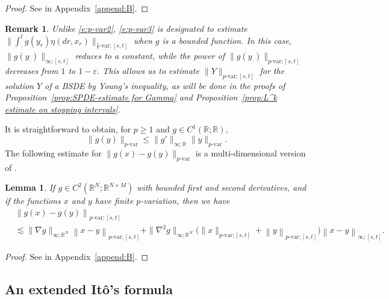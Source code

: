 \documentclass[11pt,reqno]{amsart}
\def\R{\mathbb R}
\newtheorem{lemma}{Lemma}[section]
\newtheorem{remark}{Remark}[section]
\numberwithin{equation}{section}
\begin{document}
\begin{proof}
See  in Appendix~\ref{append:B}.
\end{proof}

\begin{remark}\label{rem:interpolation}
Unlike \eqref{e:p-var2}, \eqref{e:p-var3} is designated to estimate $ \|\int_{\cdot}^{t} g(y_{r})\eta(dr,x_{r}) \|_{\frac{1}{\tau}\text{-}\mathrm{var};[s,t]}$ when $g$ is a \emph{bounded} function. In this case, $\|g(y_\cdot)\|_{\infty;[s,t]}$ reduces to a constant, while the power of $\|g(y_\cdot)\|_{p\text{-}\mathrm{var};[s,t]}$ decreases from $1$ to $1-\varepsilon$. This allows us to estimate $\|Y\|_{p\text{-}\mathrm{var};[s,t]}$ for the solution
$Y$ of a BSDE by Young's inequality, as will be done in the proofs of Proposition~\ref{prop:SPDE-estimate for Gamma} and Proposition~\ref{prop:L^k estimate on stopping intervals}.
\end{remark}	

It is straightforward to obtain, for 
$p\ge 1$ and $g\in C^1(\R;\R)$,  
\begin{equation*}
\|g(y) \|_{p\text{-var}} \le \|g'\|_{\infty;\R} \|y \|_{p\text{-var}}. 
\end{equation*}		
The following estimate for $\|g(x) - g(y)\|_{p\text{-var}}$ is a multi-dimensional version of \cite[Lemma~1]{DiehlZhang}. 
\begin{lemma}\label{lem:delta-g}
If $g\in C^{2}(\mathbb{R}^{N};\mathbb{R}^{N\times M})$ with bounded first and second derivatives, and if the functions $x$ and $y$ have finite $p$-variation, then we have
\begin{equation*}
\begin{aligned}
&\left\|g(x)-g(y)\right\|_{p\text{-}\mathrm{var};[s,t]}\\
&  \lesssim \|\nabla g\|_{\infty;\mathbb{R}^N}\left\|x-y\right\|_{p\text{-}\mathrm{var};[s,t]}+\|\nabla^2 g\|_{\infty;\mathbb{R}^N}\Big(\|x\|_{p\text{-}\mathrm{var};[s,t]}+ \left\|y\right\|_{p\text{-}\mathrm{var};[s,t]}\Big)\left\|x-y\right\|_{\infty;[s,t]}.
\end{aligned}
\end{equation*}
\end{lemma}

\begin{proof}
See  in Appendix~\ref{append:B}.
\end{proof}


\subsection{An extended It\^o's formula}\label{sec:Ito's formula}
\end{document}
